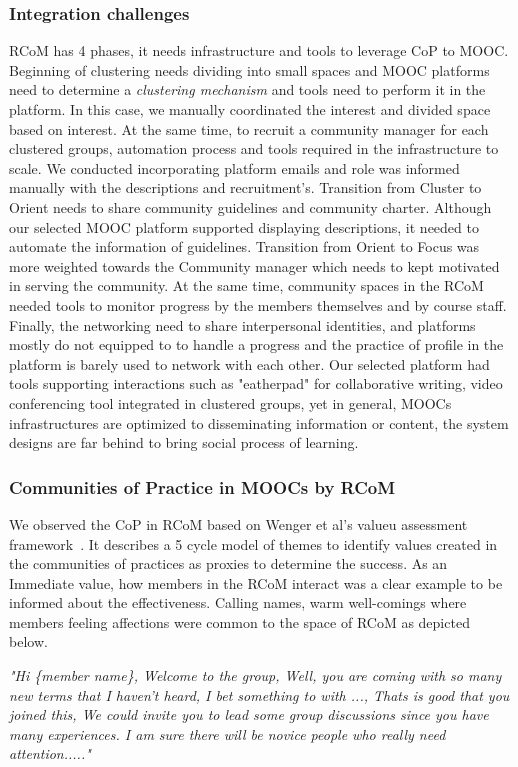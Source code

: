 \documentclass[format=acmsmall, review=false, screen=true]{acmart}
\begin{document}
\subsubsection{Integration challenges}
RCoM has 4 phases, it needs infrastructure and tools to leverage CoP to MOOC. Beginning of clustering needs dividing into small spaces and MOOC platforms need to determine a \textit{clustering mechanism} and tools need to perform it in the platform. In this case, we manually coordinated the interest and divided space based on interest. At the same time, to recruit a community manager for each clustered groups, automation process and tools required in the infrastructure to scale. We conducted incorporating platform emails and role was informed manually with the descriptions and recruitment's. Transition from Cluster to Orient needs to share community guidelines and community charter. Although our selected MOOC platform supported displaying descriptions, it needed to automate the information of guidelines. Transition from Orient to Focus was more weighted towards the Community manager which needs to kept motivated in serving the community. At the same time, community spaces in the RCoM needed tools to monitor progress by the members themselves and by course staff. Finally, the networking need to share interpersonal identities, and platforms mostly do not equipped to to handle a progress and the practice of profile in the platform is barely used to network with each other. Our selected platform had tools supporting interactions such as "eatherpad" for collaborative writing, video conferencing tool integrated in clustered groups, yet in general, MOOCs infrastructures are optimized to disseminating information or content, the system designs are far behind to bring social process of learning. 

\subsubsection{Communities of Practice in MOOCs by RCoM}
We observed the CoP in RCoM based on Wenger et al's valueu assessment framework~\cite{wenger2011promoting}. It describes a 5 cycle model of themes to identify values created in the communities of practices as proxies to determine the success. As an Immediate value, how members in the RCoM interact was a clear example to be informed about the effectiveness. Calling names, warm well-comings where members feeling affections were common to the space of RCoM as depicted below. 

\textit{"Hi \{member name\}, Welcome to the group, Well, you are coming with so many new terms that I haven't heard, I bet something to with {...}, 
Thats is good that you joined this, We could invite you to lead some group discussions since you have many experiences. I am sure there will be novice people who really need attention....."}
\end{document}
